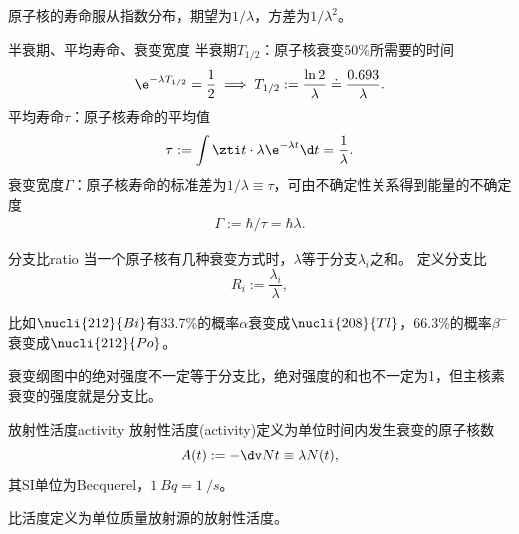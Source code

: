 \begin{corollary}
	原子核的寿命服从指数分布，期望为$1/\lambda$，方差为$1/\lambda^2$。
\end{corollary}


\begin{definition}{半衰期、平均寿命、衰变宽度}{}
	半衰期$T_{1/2}$：原子核衰变50\%所需要的时间
	\begin{equation}
		\e^{-\lambda T_{1/2}}=\frac12\implies T_{1/2}:=\frac{\ln 2}\lambda\doteq\frac{0.693}\lambda.
	\end{equation}
	平均寿命$\tau$：原子核寿命的平均值
	\begin{align}
		\tau:=\int\zti t\cdot\lambda\e^{-\lambda t}\d t=\frac1\lambda.
	\end{align}
	衰变宽度$\varGamma$：原子核寿命的标准差为$1/\lambda\equiv\tau$，可由不确定性关系得到能量的不确定度
	\begin{align}
		\varGamma:=\hbar/\tau=\hbar\lambda.
	\end{align}
\end{definition}

\begin{definition}{分支比}{ratio}
	当一个原子核有几种衰变方式时，$\lambda$等于分支$\lambda_i$之和。
	定义分支比
	\begin{equation}
		R_i:=\frac{\lambda_i}\lambda,
	\end{equation}
\end{definition}

比如$\nucli{212}{Bi}$有33.7\%的概率$\alpha$衰变成$\nucli{208}{Tl}$，66.3\%的概率$\beta^-$衰变成$\nucli{212}{Po}$。

\begin{remark}
	衰变纲图中的绝对强度不一定等于分支比，绝对强度的和也不一定为1，但主核素衰变的强度就是分支比。
\end{remark}

\begin{definition}{放射性活度}{activity}
	放射性活度(activity)定义为单位时间内发生衰变的原子核数
	\begin{equation}
		A(t):=-\dv Nt\equiv\lambda N(t),
	\end{equation}
	其SI单位为Becquerel，$\SI{1}{Bq}=\SI{1}{\per s}$。
	
	比活度定义为单位质量放射源的放射性活度。
\end{definition}


